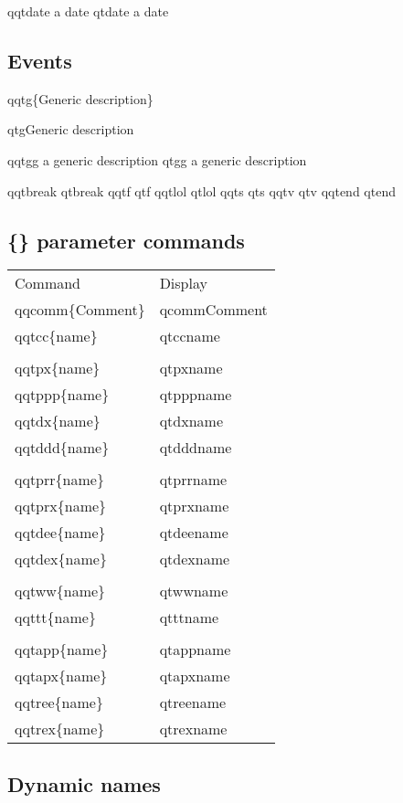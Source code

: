 \documentclass{article}
\begin{document}
qqtdate a date
qtdate a date


\newpage

\subsection{Events}

qqtg\{Generic description\}

qtg{Generic description}

qqtgg a generic description qtgg a generic description

qqtbreak qtbreak
qqtf qtf
qqtlol qtlol
qqts qts
qqtv qtv
qqtend qtend

\newpage

\subsection{\{\} parameter commands}

\begin{tabular}{ll}
Command & Display \\
qqcomm\{Comment\} & qcomm{Comment} \\ 
qqtcc\{name\} & qtcc{name} \\ 
\\
qqtpx\{name\} & qtpx{name} \\ 
qqtppp\{name\} & qtppp{name} \\ 
qqtdx\{name\} & qtdx{name} \\ 
qqtddd\{name\} & qtddd{name} \\ 
\\
qqtprr\{name\} & qtprr{name} \\ 
qqtprx\{name\} & qtprx{name} \\ 
qqtdee\{name\} & qtdee{name} \\ 
qqtdex\{name\} & qtdex{name} \\ 
\\
qqtww\{name\} & qtww{name} \\ 
qqttt\{name\} & qttt{name} \\ 
\\
qqtapp\{name\} & qtapp{name} \\ 
qqtapx\{name\} & qtapx{name} \\ 

qqtree\{name\} & qtree{name} \\ 
qqtrex\{name\} & qtrex{name} \\ 
\end{tabular}
\bigskip

\subsection{Dynamic names}
\end{document}
